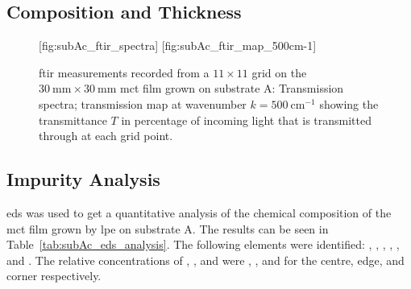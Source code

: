 \subsection{Composition and Thickness}


\begin{figure}[htbp]
    \centering
    [fig:subAc_ftir_spectra]
    \hfill
    [fig:subAc_ftir_map_500cm-1]
    \caption[\Ac{ftir} measurements of the \ac{mct} film grown on substrate A.]{\Ac{ftir} measurements recorded from a $11\times11$ grid on the $\SI{30}{\milli\metre}\times\SI{30}{\milli\metre}$ \ac{mct} film grown on substrate A:  Transmission spectra;  transmission map at wavenumber $k=\SI{500}{\centi\metre^{-1}}$ showing the transmittance $T$ in percentage of incoming light that is transmitted through at each grid point.}
\end{figure}

\subsection{Impurity Analysis}

\Ac{eds} was used to get a quantitative analysis of the chemical composition of the \ac{mct} film grown by \ac{lpe} on substrate A. The results can be seen in Table~\ref{tab:subAc_eds_analysis}. The following elements were identified: , , , , , and . The relative concentrations of , , and  were , , and  for the centre, edge, and corner respectively. 

